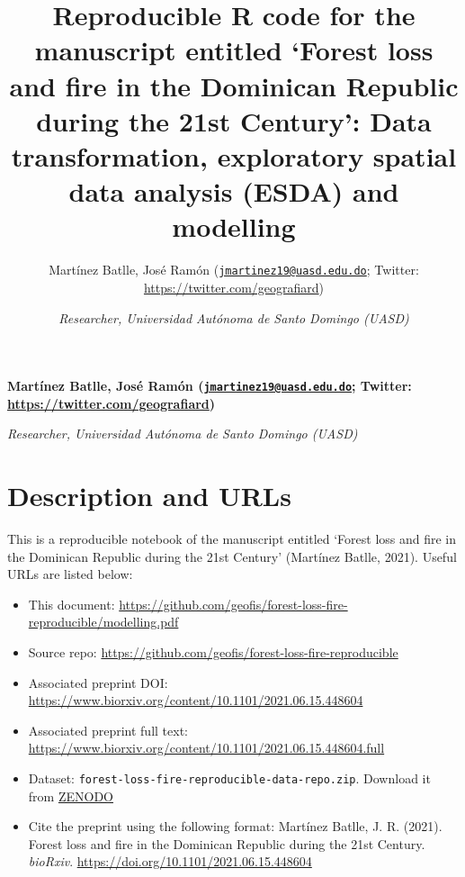 \documentclass[10pt,landscape,a3paper]{article}
\title{Reproducible R code for the manuscript entitled `Forest loss and
fire in the Dominican Republic during the 21st Century': Data
transformation, exploratory spatial data analysis (ESDA) and
modelling  }
\author{\Large Martínez Batlle, José Ramón
(\href{mailto:jmartinez19@uasd.edu.do}{\nolinkurl{jmartinez19@uasd.edu.do}};
Twitter:
\url{https://twitter.com/geografiard})\vspace{0.05in} \newline\normalsize\emph{}   \and \Large \vspace{0.05in} \newline\normalsize\emph{Researcher,
Universidad Autónoma de Santo Domingo (UASD)}  }
\date{}
\newcommand*{\authorfont}{\fontfamily{phv}\selectfont}
\begin{document}
	
%    


{%
\setlength{\parindent}{0pt}
\thispagestyle{plain}
{\fontsize{18}{20}\selectfont\raggedright 
\maketitle  %

}

{
   \vskip 13.5pt\relax \normalsize\fontsize{11}{12} 
\textbf{\authorfont Martínez Batlle, José Ramón
(\href{mailto:jmartinez19@uasd.edu.do}{\nolinkurl{jmartinez19@uasd.edu.do}};
Twitter:
\url{https://twitter.com/geografiard})} \hskip 15pt \emph{\small }   \par \textbf{\authorfont } \hskip 15pt \emph{\small Researcher,
Universidad Autónoma de Santo Domingo (UASD)}   

}

}






\vskip 6.5pt

{
\hypersetup{linkcolor=black}
\setcounter{tocdepth}{4}
\tableofcontents
}

\noindent  \hypertarget{description-and-urls}{%
\section{Description and URLs}\label{description-and-urls}}

This is a reproducible notebook of the manuscript entitled `Forest loss
and fire in the Dominican Republic during the 21st Century' (Martínez
Batlle, 2021). Useful URLs are listed below:

\begin{itemize}
\item
  This document:
  \url{https://github.com/geofis/forest-loss-fire-reproducible/modelling.pdf}
\item
  Source repo:
  \url{https://github.com/geofis/forest-loss-fire-reproducible}
\item
  Associated preprint DOI:
  \url{https://www.biorxiv.org/content/10.1101/2021.06.15.448604}
\item
  Associated preprint full text:
  \url{https://www.biorxiv.org/content/10.1101/2021.06.15.448604.full}
\item
  Dataset: \texttt{forest-loss-fire-reproducible-data-repo.zip}.
  Download it from \href{https://zenodo.org/record/5681481}{ZENODO}
\item
  Cite the preprint using the following format: Martínez Batlle, J. R.
  (2021). Forest loss and fire in the Dominican Republic during the 21st
  Century. \emph{bioRxiv}.
  \url{https://doi.org/10.1101/2021.06.15.448604}
\end{itemize}
\end{document}
